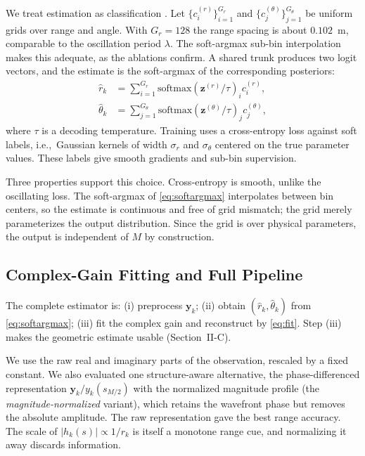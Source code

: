 \documentclass[journal]{IEEEtran}
\begin{document}
We treat estimation as classification \cite{softargmax}. Let $\{c^{(r)}_i\}_{i=1}^{G_r}$ and $\{c^{(\theta)}_j\}_{j=1}^{G_\theta}$ be uniform grids over range and angle. With $G_r=128$ the range spacing is about $0.102$~m, comparable to the oscillation period $\lambda$. The soft-argmax sub-bin interpolation makes this adequate, as the ablations confirm. A shared trunk produces two logit vectors, and the estimate is the soft-argmax of the corresponding posteriors:
\begin{equation}
\begin{aligned}
\hat r_k &= \sum_{i=1}^{G_r} \mathrm{softmax}\!\left(\mathbf{z}^{(r)}/\tau\right)_{i} c^{(r)}_i, \\
\hat\theta_k &= \sum_{j=1}^{G_\theta} \mathrm{softmax}\!\left(\mathbf{z}^{(\theta)}/\tau\right)_{j} c^{(\theta)}_j,
\end{aligned}
\label{eq:softargmax}
\end{equation}
where $\tau$ is a decoding temperature. Training uses a cross-entropy loss against soft labels, i.e.,\ Gaussian kernels of width $\sigma_r$ and $\sigma_\theta$ centered on the true parameter values. These labels give smooth gradients and sub-bin supervision.

Three properties support this choice. Cross-entropy is smooth, unlike the oscillating loss. The soft-argmax of \eqref{eq:softargmax} interpolates between bin centers, so the estimate is continuous and free of grid mismatch; the grid merely parameterizes the output distribution. Since the grid is over physical parameters, the output is independent of $M$ by construction.

\subsection{Complex-Gain Fitting and Full Pipeline}

The complete estimator is: (i) preprocess $\mathbf{y}_k$; (ii) obtain $(\hat r_k, \hat\theta_k)$ from \eqref{eq:softargmax}; (iii) fit the complex gain and reconstruct by \eqref{eq:fit}. Step (iii) makes the geometric estimate usable (Section~II-C).

We use the raw real and imaginary parts of the observation, rescaled by a fixed constant. We also evaluated one structure-aware alternative, the phase-differenced representation $\mathbf{y}_k/y_k(s_{M/2})$ with the normalized magnitude profile (the \emph{magnitude-normalized} variant), which retains the wavefront phase but removes the absolute amplitude. The raw representation gave the best range accuracy. The scale of $|h_k(s)| \propto 1/r_k$ is itself a monotone range cue, and normalizing it away discards information.
\end{document}
